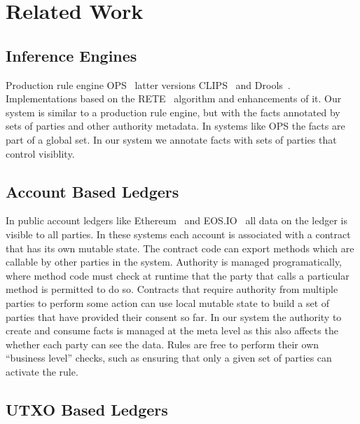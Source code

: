 
\clearpage{}

\label{s:Related}
\section{Related Work}

\subsection{Inference Engines}
Production rule engine OPS~\cite{Forgy1981:OPS5} latter versions CLIPS~\cite{Riley2017:CLIPS} and Drools~\cite{Proctor2008:Drools}. Implementations based on the RETE~\cite{Forgy1981:RETE} algorithm and enhancements \cite{Doorenbos1995:ProductionMatching} of it. Our system is similar to a production rule engine, but with the facts annotated by sets of parties and other authority metadata. In systems like OPS the facts are part of a global set. In our system we annotate facts with sets of parties that control visiblity.


\subsection{Account Based Ledgers}
In public account ledgers like Ethereum~\cite{Wood2014:Ethereum} and EOS.IO~\cite{Lee2018:EOSIO} all data on the ledger is visible to all parties. In these systems each account is associated with a contract that has its own mutable state. The contract code can export methods which are callable by other parties in the system. Authority is managed programatically, where method code must check at runtime that the party that calls a particular method is permitted to do so. Contracts that require authority from multiple parties to perform some action can use local mutable state to build a set of parties that have provided their consent so far. In our system the authority to create and consume facts is managed at the meta level as this also affects the whether each party can see the data. Rules are free to perform their own ``business level'' checks, such as ensuring that only a given set of parties can activate the rule.


\subsection{UTXO Based Ledgers}


